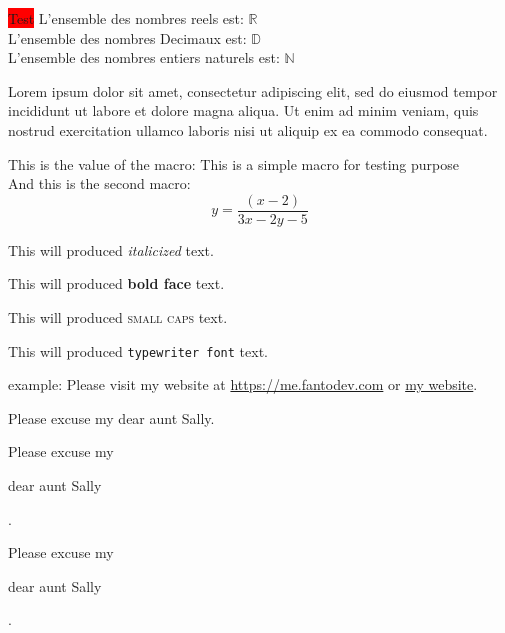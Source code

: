\documentclass[12pt, a4paper]{article}
\def\makro1{This is a simple macro for testing purpose}
\def\eq1{y = \frac{(x-2)}{3x-2y-5}}
\newcommand\shortlorem{Lorem ipsum dolor sit amet, consectetur adipiscing elit, sed do eiusmod tempor incididunt ut labore et dolore magna aliqua. Ut enim ad minim veniam, quis nostrud exercitation ullamco laboris nisi ut aliquip ex ea commodo consequat.}
\begin{document}
\maketitle

\pagebreak
\tableofcontents

\pagebreak

\colorbox{red}{Test}
L'ensemble des nombres reels est: $\mathbb{R}$ \\
L'ensemble des nombres Decimaux est: $\mathbb{D}$ \\
L'ensemble des nombres entiers naturels est: $\mathbb{N}$

\vspace{1cm}
\shortlorem
\vspace{1cm}

This is the value of the macro: \makro1\\
And this is the second macro: $$\eq1$$



\pagebreak


This will produced \textit{italicized} text.

This will produced \textbf{bold face} text.

This will produced \textsc{small caps} text.

This will produced \texttt{typewriter font} text.

example: Please visit my website at \url{https://me.fantodev.com} or
\href{https://next.fantodev.com}{my website}.

\vspace*{1cm}
Please excuse my dear aunt Sally.

Please excuse my \begin{Large}dear aunt Sally\end{Large}.

Please excuse my \begin{huge}dear aunt Sally\end{huge}.

\end{document}
